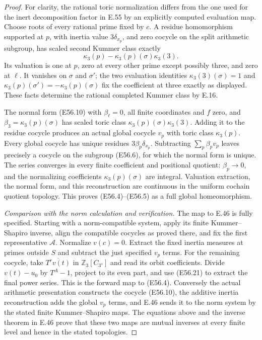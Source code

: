 \begin{proof}
For clarity, the rational
toric normalization differs
from the one used for the
inert decomposition factor
in E.55 by an explicitly
computed evaluation map.
Choose roots of every
rational prime fixed by
$c$. A residue homomorphism
supported at $p$, with
inertia value $3\delta_{x_p}$,
and zero cocycle on the
split arithmetic subgroup,
has scaled second Kummer
class exactly
\[
                    \kappa_3(p)
                       -\kappa_3(p)(\sigma)\kappa_3(3).
 \tag{E56.22}
\]
Its valuation is one at
$p$, zero at every other
prime except possibly
three, and zero at $\ell$.
It vanishes on $\sigma$
and $\sigma'$; the
two evaluation identities
$\kappa_3(3)(\sigma)=1$
and
$\kappa_3(p)(\sigma')
=-\kappa_3(p)(\sigma)$
fix the coefficient at
three exactly as displayed.
These facts determine
the rational completed
Kummer class by E.16.

The normal form
(E56.10) with
$\beta_\ell=0$,
all finite coordinates
and $f$ zero, and
$\beta_3=\kappa_3(p)(\sigma)$
has scaled toric class
$\kappa_3(p)(\sigma)\kappa_3(3)$.
Adding it to the residue
cocycle produces an
actual global cocycle
$v_p$ with toric class
$\kappa_3(p)$.
Every global cocycle has
unique residues
$3\beta_p\delta_{x_p}$.
Subtracting
$\sum_p\beta_pv_p$
leaves precisely a
cocycle on the subgroup
(E56.6), for which the
normal form is unique.
The series converges
in every finite
coefficient and
positional quotient:
$\beta_p\to0$, and the
normalizing coefficients
$\kappa_3(p)(\sigma)$
are integral.
Valuation extraction,
the normal form, and
this reconstruction
are continuous in the
uniform cochain
quotient topology.
This proves
(E56.4)--(E56.5) as
a full global
homeomorphism.

\emph{Comparison with the norm calculation and verification.}
The map to E.46 is fully
specified. Starting with
a norm-compatible system,
apply its finite Kummer--Shapiro
inverse, align the compatible
cocycles as proved there,
and fix the first representative
$\mathcal A$. Normalize
$v(c)=0$. Extract the
fixed inertia measures
at primes outside $S$
and subtract the just
specified $v_p$ terms.
For the remaining
cocycle, take
$\overline{T^r v(t)}$
in $\mathbb Z_3[C_{3^s}]$
and read its orbit
coefficients. Divide
$v(t)-u_0$ by $T^A-1$,
project to its even
part, and use
(E56.21) to extract
the final power series.
This is the forward
map to (E56.4).
Conversely the actual
arithmetic presentation
constructs the cocycle
(E56.10), the additive
inertia reconstruction
adds the global $v_p$
terms, and E.46 sends
it to the norm system
by the stated finite
Kummer--Shapiro maps.
The equations above
and the inverse theorem
in E.46 prove that
these two maps are
mutual inverses at
every finite level
and hence in the
stated topologies.


\end{proof}
